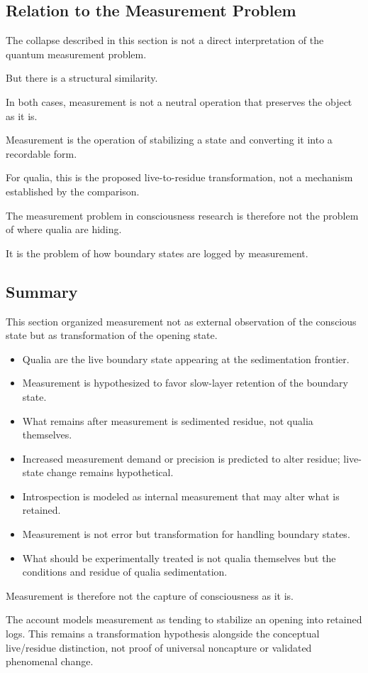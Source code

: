 \subsection{Relation to the Measurement Problem}


The collapse described in this section is not a direct interpretation of the quantum measurement problem.

But there is a structural similarity.

In both cases, measurement is not a neutral operation that preserves the object as it is.

Measurement is the operation of stabilizing a state and converting it into a recordable form.

For qualia, this is the proposed live-to-residue transformation, not a mechanism established by the comparison.

The measurement problem in consciousness research is therefore not the problem of where qualia are hiding.

It is the problem of how boundary states are logged by measurement.

\subsection{Summary}


This section organized measurement not as external observation of the conscious state but as transformation of the opening state.

\begin{itemize}
\item Qualia are the live boundary state appearing at the sedimentation frontier.
\item Measurement is hypothesized to favor slow-layer retention of the boundary state.
\item What remains after measurement is sedimented residue, not qualia themselves.
\item Increased measurement demand or precision is predicted to alter residue; live-state change remains hypothetical.
\item Introspection is modeled as internal measurement that may alter what is retained.
\item Measurement is not error but transformation for handling boundary states.
\item What should be experimentally treated is not qualia themselves but the conditions and residue of qualia sedimentation.
\end{itemize}

Measurement is therefore not the capture of consciousness as it is.

The account models measurement as tending to stabilize an opening into retained logs. This remains a transformation hypothesis alongside the conceptual live/residue distinction, not proof of universal noncapture or validated phenomenal change.
